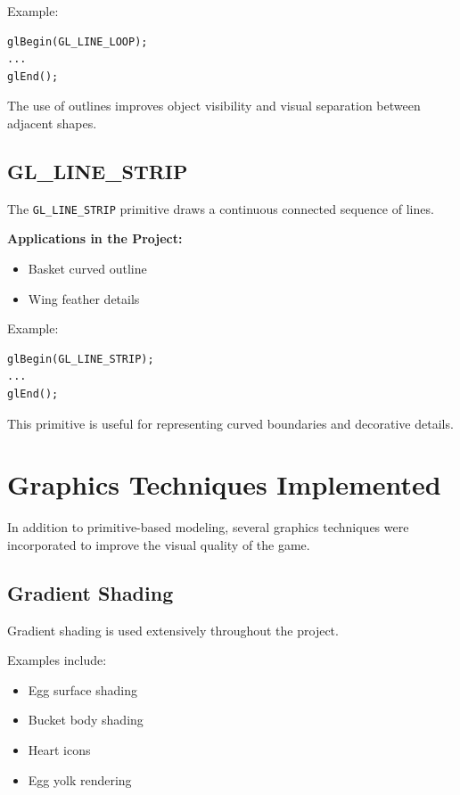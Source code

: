 \documentclass[12pt,a4paper]{report}
\begin{document}
Example:

\begin{verbatim}
glBegin(GL_LINE_LOOP);
...
glEnd();
\end{verbatim}

The use of outlines improves object visibility and visual separation between adjacent shapes.

\subsection*{GL\_LINE\_STRIP}

The \texttt{GL\_LINE\_STRIP} primitive draws a continuous connected sequence of lines.

\textbf{Applications in the Project:}

\begin{itemize}
\item Basket curved outline
\item Wing feather details
\end{itemize}

Example:

\begin{verbatim}
glBegin(GL_LINE_STRIP);
...
glEnd();
\end{verbatim}

This primitive is useful for representing curved boundaries and decorative details.

\section{Graphics Techniques Implemented}

In addition to primitive-based modeling, several graphics techniques were incorporated to improve the visual quality of the game.

\subsection*{Gradient Shading}

Gradient shading is used extensively throughout the project.

Examples include:

\begin{itemize}
\item Egg surface shading
\item Bucket body shading
\item Heart icons
\item Egg yolk rendering
\end{itemize}
\end{document}

